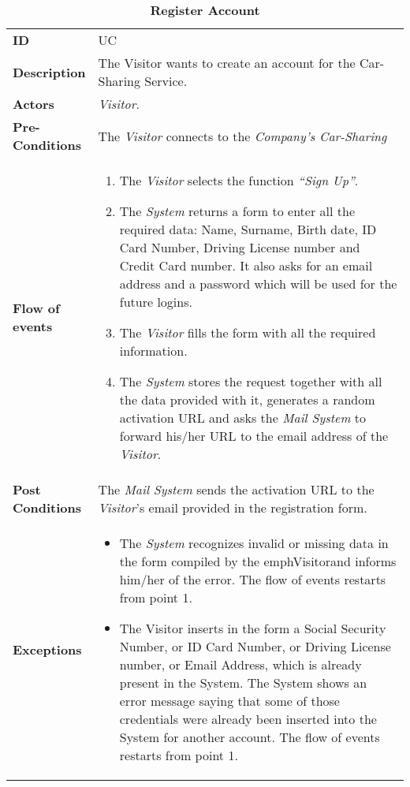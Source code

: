 

\begin{longtable}{|p{0.2\linewidth} p{0.8\linewidth}|}
	\captionsetup{labelformat=empty} %
	\caption{\textbf{Register Account}} %
	\label{UC_Register}%
	\\ \hline %
	
	\textbf{ID} & UC\theUseCaseIdCounter \\ \hline
	\textbf{Description} & The Visitor wants to create an account for the Car-Sharing Service. \\ \hline
	\textbf{Actors} & \emph{Visitor}.\\ \hline
	\textbf{Pre-Conditions} & The \emph{Visitor} connects to the \emph{Company's Car-Sharing}} WebSite/Application. \\ \hline
	\textbf{Flow of events} & 
		\begin{enumerate}
			\item The \emph{Visitor} selects the function \textit{\textquotedblleft{Sign Up}\textquotedblright}.
			\item The \emph{System} returns a form to enter all the required data: Name, Surname, Birth date, ID Card Number, Driving License number and Credit Card number. It also asks for an email address and a password which will be used for the future logins.
			\item The \emph{Visitor} fills the form with all the required information.
			\item The \emph{System} stores the request together with all the data provided with it, generates a random activation URL and asks the \emph{Mail System} to forward his/her URL to the email address of the \emph{Visitor}.
		\end{enumerate}	 \\ \hline
	\textbf{Post Conditions} & The \emph{Mail System} sends the activation URL to the \emph{Visitor}'s email provided in the registration form. \\ \hline
	\textbf{Exceptions} & 
		\begin{itemize}
		\item The \emph{System} recognizes invalid or missing data in the form compiled by the emph{Visitor}and informs him/her of the error. The flow of events restarts from point 1.
		\item The Visitor inserts in the form a Social Security Number, or ID Card Number, or Driving License number, or Email Address, which is already present in the System. The System shows an error message saying that some of those credentials were already been inserted into the System for another account. The flow of events restarts from point 1.
		\end{itemize} \\ \hline
\end{longtable}

